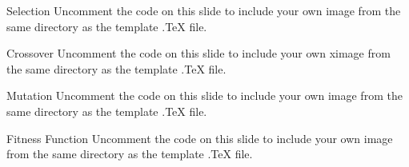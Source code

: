 \documentclass[aspectratio=169,xcolor=dvipsnames]{beamer}
\begin{document}

\begin{frame}{Selection}
    Uncomment the code on this slide to include your own image from the same directory as the template .TeX file.
\end{frame}


\begin{frame}{Crossover}
    Uncomment the code on this slide to include your own ximage from the same directory as the template .TeX file.
\end{frame}


\begin{frame}{Mutation}
    Uncomment the code on this slide to include your own image from the same directory as the template .TeX file.
\end{frame}


\begin{frame}{Fitness Function}
    Uncomment the code on this slide to include your own image from the same directory as the template .TeX file.
\end{frame}

\end{document}
